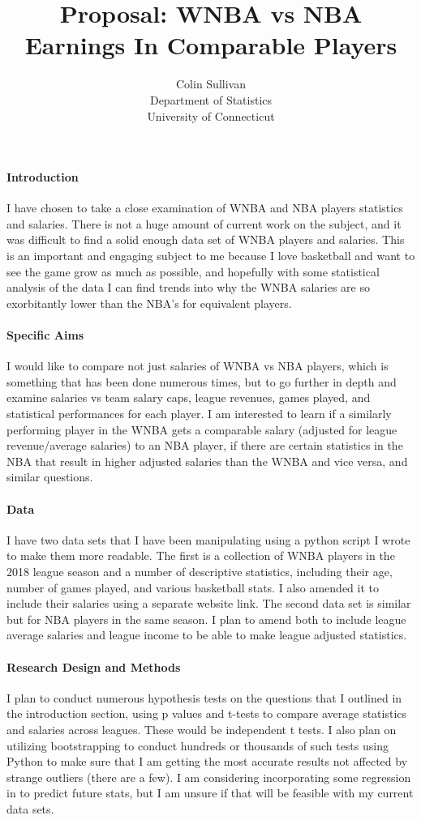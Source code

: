 \documentclass[12pt]{article}
\title{Proposal: WNBA vs NBA Earnings In Comparable Players}
\author{Colin Sullivan\\
  Department of Statistics\\
  University of Connecticut
}
\begin{document}
\maketitle


\paragraph{Introduction}
I have chosen to take a close examination of WNBA and NBA players statistics and salaries. There is not a huge amount of current work on the subject, and it was difficult to find a solid enough data set of WNBA players and salaries. This is an important and engaging subject to me because I love basketball and want to see the game grow as much as possible, and hopefully with some statistical analysis of the data I can find trends into why the WNBA salaries are so exorbitantly lower than the NBA's for equivalent players.

\paragraph{Specific Aims}
I would like to compare not just salaries of WNBA vs NBA players, which is something that has been done numerous times, but to go further in depth and examine salaries vs team salary caps, league revenues, games played, and statistical performances for each player. I am interested to learn if a similarly performing player in the WNBA gets a comparable salary (adjusted for league revenue/average salaries) to an NBA player, if there are certain statistics in the NBA that result in higher adjusted salaries than the WNBA and vice versa, and similar questions.

\paragraph{Data}
I have two data sets that I have been manipulating using a python script I wrote to make them more readable. The first is a collection of WNBA players in the 2018 league season and a number of descriptive statistics, including their age, number of games played, and various basketball stats. I also amended it to include their salaries using a separate website link. The second data set is similar but for NBA players in the same season. I plan to amend both to include league average salaries and league income to be able to make league adjusted statistics.

\paragraph{Research Design and Methods}
I plan to conduct numerous hypothesis tests on the questions that I outlined in the introduction section, using p values and t-tests to compare average statistics and salaries across leagues. These would be independent t tests. I also plan on utilizing bootstrapping to conduct hundreds or thousands of such tests using Python to make sure that I am getting the most accurate results not affected by strange outliers (there are a few). I am considering incorporating some regression in to predict future stats, but I am unsure if that will be feasible with my current data sets.
\end{document}
